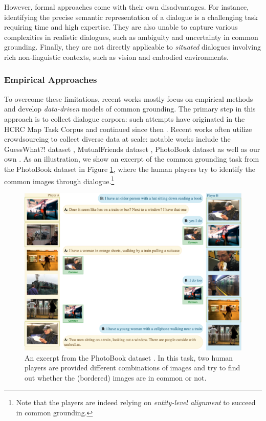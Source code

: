However, formal approaches come with their own disadvantages. For instance, identifying the precise semantic representation of a dialogue is a challenging task requiring time and high expertise. They are also unable to capture various complexities in realistic dialogues, such as ambiguity and uncertainty in common grounding. Finally, they are not directly applicable to \textit{situated} dialogues involving rich non-linguistic contexts, such as vision and embodied environments.

\subsubsection{Empirical Approaches}

To overcome these limitations, recent works mostly focus on empirical methods and develop \textit{data-driven} models of common grounding. The primary step in this approach is to collect dialogue corpora: such attempts have originated in the HCRC Map Task Corpus \citep{anderson1991hcrc} and continued since then \citep{potts2012goal,tokunaga-etal-2012-rex,zarriess-etal-2016-pentoref}. Recent works often utilize crowdsourcing to collect diverse data at scale: notable works include the GuessWhat?! dataset \citep{de2017guesswhat}, MutualFriends dataset \citep{he2017learning}, PhotoBook dataset \citep{haber-etal-2019-photobook} as well as our own \citep{udagawa2019natural,udagawa2021maintaining}. As an illustration, we show an excerpt of the common grounding task from the PhotoBook dataset in Figure \ref{02_fig:photobook_sample}, where the human players try to identify the common images through dialogue.\footnote{Note that the players are indeed relying on \textit{entity-level alignment} to succeed in common grounding.}

\begin{figure}[t!]
\centering
\includegraphics[width=\textwidth]{photobook_dataset_sample.pdf}
\caption{An excerpt from the PhotoBook dataset \citep{haber-etal-2019-photobook}. In this task, two human players are provided different combinations of images and try to find out whether the (bordered) images are in common or not.
}
\label{02_fig:photobook_sample}
\end{figure}

